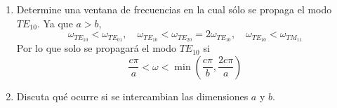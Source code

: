 \documentclass[]{article}
\numberwithin{equation}{section}
\begin{document}
\begin{enumerate}
\begin{enumerate}
		\item[(b)] Determine una ventana de frecuencias en la cual sólo se propaga el modo ${T\!E}_{10}$.
		\resp Ya que $a > b$,
		\begin{equation}
			\omega_{{T\!E}_{10}} < \omega_{{T\!E}_{01}}, \quad \omega_{{T\!E}_{10}} < \omega_{{T\!E}_{20}} = 2 \omega_{{T\!E}_{10}}, \quad \omega_{{T\!E}_{10}} < \omega_{{T\!M}_{11}}
		\end{equation}
		Por lo que solo se propagará el modo ${{T\!E}_{10}}$ si
		\begin{equation}
			\frac{c \pi}{a} < \omega < \min\left(\frac{c \pi}{b}, \frac{2 c \pi}{a}\right)
		\end{equation}
		
		\item[(c)] Discuta qué ocurre si se intercambian las dimensiones $a$ y $b$.
		\resp 
	\end{enumerate}
	

\end{enumerate}
\end{document}
